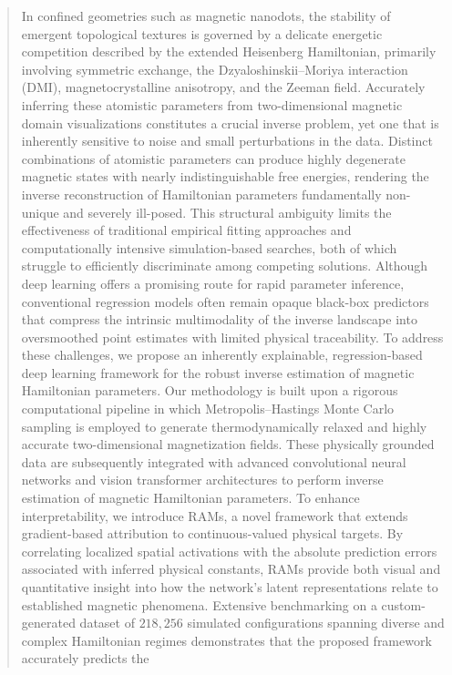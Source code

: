 \documentclass[a4paper,fleqn]{cas-sc}
\begin{document}
\begin{abstract}
In confined geometries such as magnetic nanodots, the stability of
emergent topological textures is governed by a delicate energetic
competition described by the extended Heisenberg Hamiltonian, primarily
involving symmetric exchange, the Dzyaloshinskii--Moriya interaction (DMI),
magnetocrystalline anisotropy, and the Zeeman field. Accurately
inferring these atomistic parameters from two-dimensional magnetic
domain visualizations constitutes a crucial inverse problem, yet one
that is inherently sensitive to noise and small perturbations in the
data. Distinct combinations of atomistic parameters can produce highly
degenerate magnetic states with nearly indistinguishable free energies,
rendering the inverse reconstruction of Hamiltonian parameters
fundamentally non-unique and severely ill-posed. This structural
ambiguity limits the effectiveness of traditional empirical fitting
approaches and computationally intensive simulation-based searches,
both of which struggle to efficiently discriminate among competing
solutions. Although deep learning offers a promising route for rapid
parameter inference, conventional regression models often remain opaque
black-box predictors that compress the intrinsic multimodality of the
inverse landscape into oversmoothed point estimates with limited
physical traceability. To address these challenges, we propose an
inherently explainable, regression-based deep learning framework for
the robust inverse estimation of magnetic Hamiltonian parameters. Our
methodology is built upon a rigorous computational pipeline in which
Metropolis--Hastings Monte Carlo sampling is employed to generate
thermodynamically relaxed and highly accurate two-dimensional
magnetization fields. These physically grounded data are subsequently
integrated with advanced convolutional neural networks and vision
transformer architectures to perform inverse estimation of magnetic
Hamiltonian parameters. To enhance interpretability, we introduce
RAMs, a novel framework that extends
gradient-based attribution to continuous-valued physical targets. By
correlating localized spatial activations with the absolute prediction
errors associated with inferred physical constants, RAMs provide both
visual and quantitative insight into how the network's latent
representations relate to established magnetic phenomena. Extensive
benchmarking on a custom-generated dataset of $218{,}256$ simulated
configurations spanning diverse and complex Hamiltonian regimes
demonstrates that the proposed framework accurately predicts the

\end{abstract}
\end{document}
